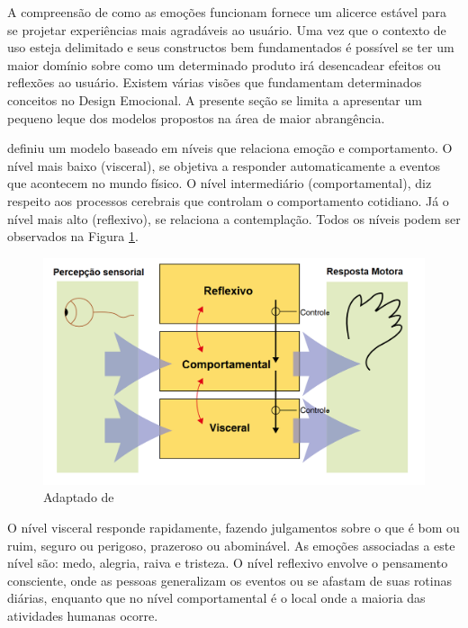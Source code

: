 \documentclass[12pt]{article}
\begin{document}
A compreensão de como as emoções funcionam fornece um alicerce estável para se projetar experiências mais agradáveis ao usuário. Uma vez que o contexto de uso esteja delimitado e seus constructos bem fundamentados é possível se ter um maior domínio sobre como um determinado produto irá desencadear efeitos ou reflexões ao usuário. Existem várias visões que fundamentam determinados conceitos no Design Emocional. A presente seção se limita a apresentar um pequeno leque dos modelos propostos na área de maior abrangência.  
 
 definiu um modelo baseado em níveis que relaciona emoção e comportamento. O nível mais baixo (visceral), se objetiva a responder automaticamente a eventos que acontecem no mundo físico. O nível intermediário (comportamental), diz respeito aos processos cerebrais que controlam o comportamento cotidiano. Já o nível mais alto (reflexivo), se relaciona a contemplação. Todos os níveis podem ser observados na Figura \ref{fig:ModeloNorman}.

\begin{figure}[ht]
\centering
\includegraphics[width=1.15\textwidth]{Figuras/ModeloNorman.png}
\caption{Adaptado de }
\label{fig:ModeloNorman}
\end{figure}

O nível visceral responde rapidamente, fazendo julgamentos sobre o que é bom ou ruim, seguro ou perigoso, prazeroso ou abominável. As emoções associadas a este nível são:  medo, alegria, raiva e tristeza. O nível reflexivo envolve o pensamento consciente, onde as pessoas generalizam os eventos ou se afastam de suas rotinas diárias, enquanto que no nível comportamental é o local onde a maioria das atividades humanas ocorre.
\end{document}
